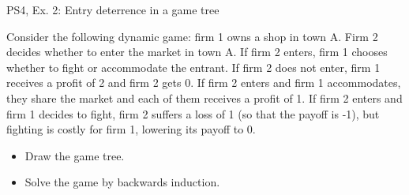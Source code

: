 \begin{frame}{PS4, Ex. 2: Entry deterrence in a game tree}
  \begin{multicols}{2}
    Consider the following dynamic game: firm 1 owns a shop in town A. Firm 2 decides whether to enter the market in town A. If firm 2 enters, firm 1 chooses whether to fight or accommodate the entrant. If firm 2 does not enter, firm 1 receives a profit of 2 and firm 2 gets 0. If firm 2 enters and firm 1 accommodates, they share the market and each of them receives a profit of 1. If firm 2 enters and firm 1 decides to fight, firm 2 suffers a loss of 1 (so that the payoff is -1), but fighting is costly for firm 1, lowering its payoff to 0.
    \begin{itemize}
      \item[(a)] Draw the game tree.
      \item[(b)] Solve the game by backwards induction.
    \end{itemize}
  \vfill\null \columnbreak
  \vfill\null
  \end{multicols}
\end{frame}
